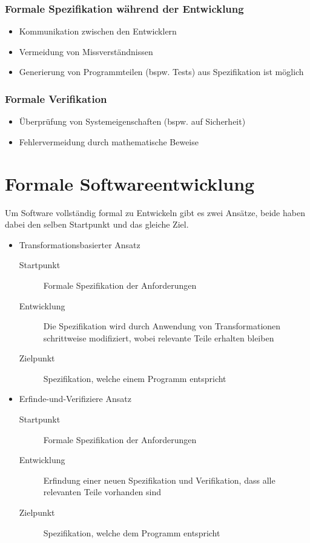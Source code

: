 															\subsubsection{Formale Spezifikation während der Entwicklung}
																\begin{itemize}
																	\item Kommunikation zwischen den Entwicklern
																	\item Vermeidung von Missverständnissen
																	\item Generierung von Programmteilen (bspw. Tests) aus Spezifikation ist möglich
																\end{itemize}

															\subsubsection{Formale Verifikation}
																\begin{itemize}
																	\item Überprüfung von Systemeigenschaften (bspw. auf Sicherheit)
																	\item Fehlervermeidung durch mathematische Beweise
																\end{itemize}

													\section{Formale Softwareentwicklung}
														Um Software vollständig formal zu Entwickeln gibt es zwei Ansätze, beide haben dabei den selben Startpunkt und das gleiche Ziel.
														\begin{itemize}
															\item Transformationsbasierter Ansatz
																\begin{description}
																	\item[Startpunkt] Formale Spezifikation der Anforderungen
																	\item[Entwicklung] Die Spezifikation wird durch Anwendung von Transformationen schrittweise modifiziert, wobei relevante Teile erhalten bleiben
																	\item[Zielpunkt] Spezifikation, welche einem Programm entspricht
																\end{description}
															\item Erfinde-und-Verifiziere Ansatz
																\begin{description}
																	\item[Startpunkt] Formale Spezifikation der Anforderungen
																	\item[Entwicklung] Erfindung einer neuen Spezifikation und Verifikation, dass alle relevanten Teile vorhanden sind
																	\item[Zielpunkt] Spezifikation, welche dem Programm entspricht
																\end{description}
														\end{itemize}


